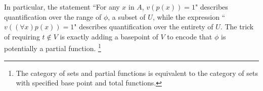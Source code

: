 \documentclass{article}
\theoremstyle{problemstyle}
\theoremstyle{lemmastyle}
\theoremstyle{theoremstyle}
\theoremstyle{problemstyle}
\begin{document}
In particular, the statement ``For any $x$ in $A$, $v(p(x)) = 1$" describes quantification over the range of $\phi$, a subset of $U$, while the expression  ``$v((\forall x)p(x)) = 1$" describes quantification over the entirety of $U$. The trick of requiring $t \notin V$ is exactly adding a basepoint of $V$ to encode that $\phi$ is potentially a partial function. \footnote{The category of sets and partial functions is equivalent to the category of sets with specified base point and total functions.} 
\end{document}
